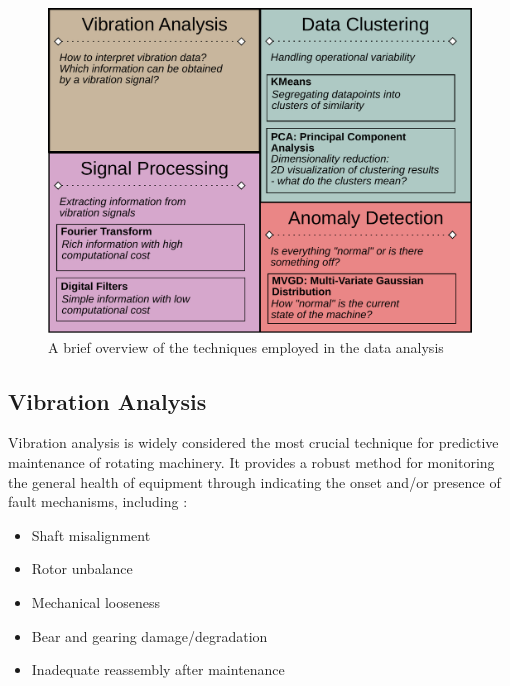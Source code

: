 \documentclass[conference]{IEEEtran}
\begin{document}
\begin{figure}[htbp]
\centerline{\includegraphics[width=\columnwidth]{graphics/techniques/techniques_block.pdf}}
\caption{A brief overview of the techniques employed in the data analysis}
\label{techniques_overview}
\end{figure}



\subsection{Vibration Analysis}
\label{sec_vibration_analysis}

Vibration analysis is widely considered the most crucial technique for predictive maintenance of rotating machinery\cite{b1}. It provides a robust method for monitoring the general health of equipment through indicating the onset and/or presence of fault mechanisms, including \cite{b1}:

\begin{itemize}
    \item Shaft misalignment
    \item Rotor unbalance
    \item Mechanical looseness
    \item Bear and gearing damage/degradation
    \item Inadequate reassembly after maintenance
\end{itemize}
\end{document}
